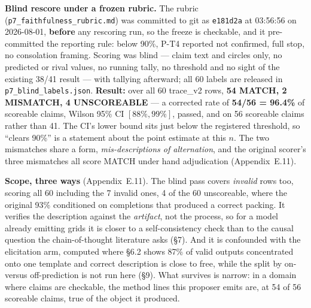 \textbf{Blind rescore under a frozen rubric.} The rubric (\texttt{p7\_faithfulness\_rubric.md}) was
committed to git as \texttt{e181d2a} at 03:56:56 on 2026-08-01, \textbf{before} any rescoring run,
so the freeze is checkable, and it pre-committed the reporting rule: below 90\%, P-T4 reported not
confirmed, full stop, no consolation framing. Scoring was blind --- claim text and circles only, no
predicted or rival values, no running tally, no threshold and no sight of the existing 38/41 result
--- with tallying afterward; all 60 labels are released in \texttt{p7\_blind\_labels.json}.
\textbf{Result:} over all 60 trace\_v2 rows, \textbf{54 MATCH, 2 MISMATCH, 4 UNSCOREABLE} --- a
corrected rate of \textbf{54/56 = 96.4\%} of scoreable claims, Wilson 95\% CI $[88\%, 99\%]$,
passed, and on 56 scoreable claims rather than 41. The CI's lower bound sits just below the
registered threshold, so ``clears 90\%'' is a statement about the point estimate at this $n$. The
two mismatches share a form, \emph{mis-descriptions of alternation}, and the original scorer's
three mismatches all score MATCH under hand adjudication (Appendix~E.11).

\textbf{Scope, three ways} (Appendix~E.11). The blind pass covers \emph{invalid} rows too, scoring
all 60 including the 7 invalid ones, 4 of the 60 unscoreable, where the original 93\% conditioned
on completions that produced a correct packing. It verifies the description against the
\emph{artifact}, not the process, so for a model already emitting grids it is closer to a
self-consistency check than to the causal question the chain-of-thought literature asks (\S7). And
it is confounded with the elicitation arm, computed where \S6.2 shows 87\% of valid outputs
concentrated onto one template and correct description is close to free, while the split by on-
versus off-prediction is not run here (\S9). What survives is narrow: in a domain where claims are
checkable, the method lines this proposer emits are, at 54 of 56 scoreable claims, true of the
object it produced.

